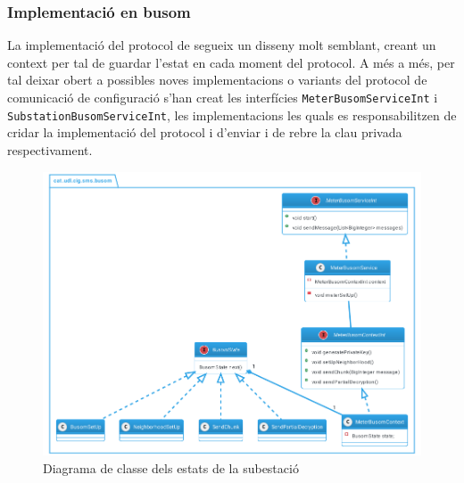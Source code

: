 \subsubsection{Implementació en busom}
La implementació del protocol de \cite{busom} segueix un disseny molt semblant, creant un context per tal de guardar l'estat en cada moment del protocol. A més a més, per tal deixar obert a possibles noves implementacions o variants del protocol de comunicació de configuració s'han creat les interfícies \texttt{MeterBusomServiceInt} i \texttt{SubstationBusomServiceInt}, les implementacions les quals es responsabilitzen de cridar la implementació del protocol i d'enviar i de rebre la clau privada respectivament.
\begin{figure}[H]
	\centering
	\includegraphics[width=14cm]{classes/busomprot.png}
	\caption{Diagrama de classe dels estats de la subestació}
	\label{fig:diss-busom}
\end{figure}

